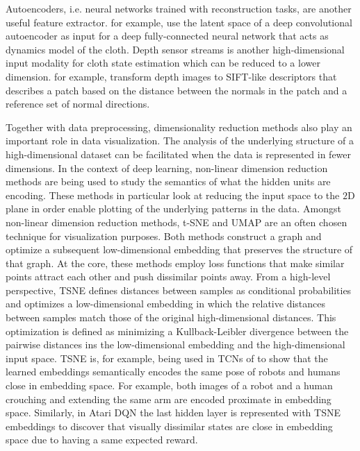 \documentclass[\home/main.tex]{subfiles}
\begin{document}
Autoencoders, i.e. neural networks trained with reconstruction tasks, are another useful feature extractor. \textcite{Yang2017} for example, use the latent space of a deep convolutional autoencoder as input for a deep fully-connected neural network that acts as dynamics model of the cloth. Depth sensor streams is another high-dimensional input modality for cloth state estimation which can be reduced to a lower dimension. \textcite{Ramisa2013} for example, transform depth images to SIFT-like descriptors that describes a patch based on the distance between the normals in the patch and a reference set of normal directions.

Together with data preprocessing, dimensionality reduction methods also play an important role in data visualization. The analysis of the underlying structure of a high-dimensional dataset can be facilitated when the data is represented in fewer dimensions. In the context of deep learning, non-linear dimension reduction methods are being used to study the semantics of what the hidden units are encoding. These methods in particular look at reducing the input space to the $2$D plane in order enable plotting of the underlying patterns in the data. Amongst non-linear dimension reduction methods, t-SNE and UMAP are an often chosen technique for visualization purposes. Both methods construct a graph and optimize a subsequent low-dimensional embedding that preserves the structure of that graph. At the core, these methods employ loss functions that make similar points attract each other and push dissimilar points away. From a high-level perspective, \gls{TSNE} defines distances between samples as conditional probabilities and optimizes a low-dimensional embedding in which the relative distances between samples match those of the original high-dimensional distances. This optimization is defined as minimizing a Kullback-Leibler divergence between the pairwise distances ins the low-dimensional embedding and the high-dimensional input space. \gls{TSNE} is, for example, being used in \glspl{TCN} of \textcite{Sermanet2017TCN} to show that the learned embeddings semantically encodes the same pose of robots and humans close in embedding space. For example, both images of a robot and a human crouching and extending the same arm are encoded proximate in embedding space. Similarly, in Atari DQN \autocite{mnih2015human} the last hidden layer is represented with \gls{TSNE} embeddings to discover that visually dissimilar states are close in embedding space due to having a same expected reward. 
\end{document}
